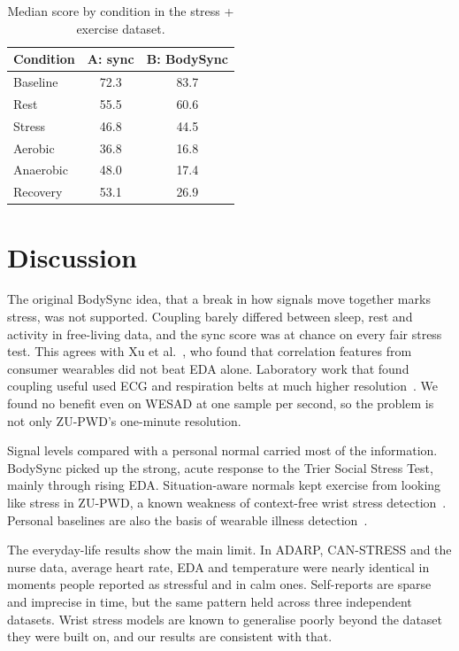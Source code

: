 \documentclass{article}
\begin{document}
\begin{table}[htbp]
\centering
\caption{Median score by condition in the stress + exercise dataset.}
\label{tab:exercise}
\begin{tabular}{lcc}
\toprule
Condition & A: sync & B: BodySync \\
\midrule
Baseline & 72.3 & 83.7 \\
Rest & 55.5 & 60.6 \\
Stress & 46.8 & 44.5 \\
Aerobic & 36.8 & 16.8 \\
Anaerobic & 48.0 & 17.4 \\
Recovery & 53.1 & 26.9 \\
\bottomrule
\end{tabular}
\end{table}

\section{Discussion}

The original BodySync idea, that a break in how signals move together marks stress, was not supported. Coupling barely differed between sleep, rest and activity in free-living data, and the sync score was at chance on every fair stress test. This agrees with Xu et al.~\cite{xu2026pilot}, who found that correlation features from consumer wearables did not beat EDA alone. Laboratory work that found coupling useful used ECG and respiration belts at much higher resolution~\cite{valenza2013coupling}. We found no benefit even on WESAD at one sample per second, so the problem is not only ZU-PWD's one-minute resolution.

Signal levels compared with a personal normal carried most of the information. BodySync picked up the strong, acute response to the Trier Social Stress Test, mainly through rising EDA. Situation-aware normals kept exercise from looking like stress in ZU-PWD, a known weakness of context-free wrist stress detection~\cite{gjoreski2017context}. Personal baselines are also the basis of wearable illness detection~\cite{mishra2020presymptomatic}.

The everyday-life results show the main limit. In ADARP, CAN-STRESS and the nurse data, average heart rate, EDA and temperature were nearly identical in moments people reported as stressful and in calm ones. Self-reports are sparse and imprecise in time, but the same pattern held across three independent datasets. Wrist stress models are known to generalise poorly beyond the dataset they were built on, and our results are consistent with that.
\end{document}
